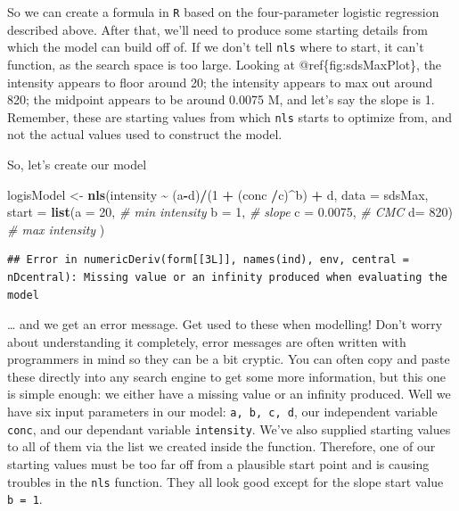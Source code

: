 \documentclass[
]{book}
\newenvironment{Shaded}{\begin{snugshade}}{\end{snugshade}}
\newcommand{\AttributeTok}[1]{\textcolor[rgb]{0.13,0.29,0.53}{#1}}
\newcommand{\CommentTok}[1]{\textcolor[rgb]{0.56,0.35,0.01}{\textit{#1}}}
\newcommand{\DecValTok}[1]{\textcolor[rgb]{0.00,0.00,0.81}{#1}}
\newcommand{\FloatTok}[1]{\textcolor[rgb]{0.00,0.00,0.81}{#1}}
\newcommand{\FunctionTok}[1]{\textcolor[rgb]{0.13,0.29,0.53}{\textbf{#1}}}
\newcommand{\NormalTok}[1]{#1}
\newcommand{\OtherTok}[1]{\textcolor[rgb]{0.56,0.35,0.01}{#1}}
\newcommand{\SpecialCharTok}[1]{\textcolor[rgb]{0.81,0.36,0.00}{\textbf{#1}}}
\begin{document}
So we can create a formula in \texttt{R} based on the four-parameter logistic regression described above. After that, we'll need to produce some starting details from which the model can build off of. If we don't tell \texttt{nls} where to start, it can't function, as the search space is too large. Looking at @ref\{fig:sdsMaxPlot\}, the intensity appears to floor around 20; the intensity appears to max out around 820; the midpoint appears to be around 0.0075 M, and let's say the slope is 1. Remember, these are starting values from which \texttt{nls} starts to optimize from, and not the actual values used to construct the model.

So, let's create our model

\begin{Shaded}
\begin{Highlighting}[]
\NormalTok{logisModel }\OtherTok{\textless{}{-}} \FunctionTok{nls}\NormalTok{(intensity }\SpecialCharTok{\textasciitilde{}}\NormalTok{  (a}\SpecialCharTok{{-}}\NormalTok{d)}\SpecialCharTok{/}\NormalTok{(}\DecValTok{1} \SpecialCharTok{+}\NormalTok{ (conc }\SpecialCharTok{/}\NormalTok{c)}\SpecialCharTok{\^{}}\NormalTok{b) }\SpecialCharTok{+}\NormalTok{ d, }
                  \AttributeTok{data =}\NormalTok{ sdsMax, }
                  \AttributeTok{start =} \FunctionTok{list}\NormalTok{(}\AttributeTok{a =} \DecValTok{20}\NormalTok{,       }\CommentTok{\# min intensity}
                               \AttributeTok{b =} \DecValTok{1}\NormalTok{,        }\CommentTok{\# slope}
                               \AttributeTok{c =} \FloatTok{0.0075}\NormalTok{,   }\CommentTok{\# CMC}
                               \AttributeTok{d=} \DecValTok{820}\NormalTok{)       }\CommentTok{\# max intensity}
\NormalTok{                  )}
\end{Highlighting}
\end{Shaded}

\begin{verbatim}
## Error in numericDeriv(form[[3L]], names(ind), env, central = nDcentral): Missing value or an infinity produced when evaluating the model
\end{verbatim}

\ldots{} and we get an error message. Get used to these when modelling! Don't worry about understanding it completely, error messages are often written with programmers in mind so they can be a bit cryptic. You can often copy and paste these directly into any search engine to get some more information, but this one is simple enough: we either have a missing value or an infinity produced. Well we have six input parameters in our model: \texttt{a,\ b,\ c,\ d}, our independent variable \texttt{conc}, and our dependant variable \texttt{intensity}. We've also supplied starting values to all of them via the list we created inside the function. Therefore, one of our starting values must be too far off from a plausible start point and is causing troubles in the \texttt{nls} function. They all look good except for the slope start value \texttt{b\ =\ 1}.
\end{document}
